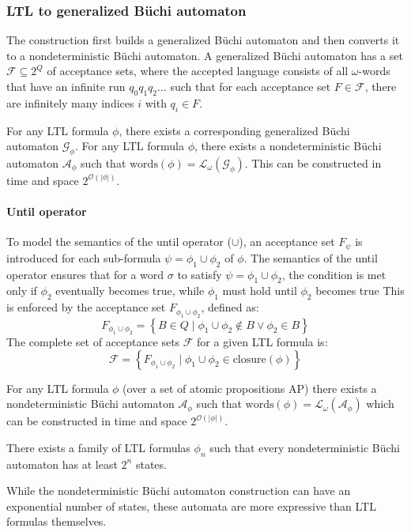 \subsubsection{LTL to generalized Büchi automaton}
The construction first builds a generalized Büchi automaton and then converts it to a nondeterministic Büchi automaton. 
A generalized Büchi automaton has a set $\mathcal{F}\subseteq 2^Q$ of acceptance sets, where the accepted language consists of all $\omega$-words that have an infinite run $q_0q_1q_2\dots$ such that for each acceptance set $F \in \mathcal{F}$, there are infinitely many indices $i$ with $q_i\in F$.

For any LTL formula $\phi$, there exists a corresponding generalized Büchi automaton $\mathcal{G}_{\phi}$. 
For any LTL formula $\phi$, there exists a nondeterministic Büchi automaton $\mathcal{A}_\phi$ such that $\text{words}(\phi)=\mathcal{L}_{\omega}(\mathcal{G}_{\phi})$. 
This can be constructed in time and space $2^{\mathcal{O}(\left\lvert \phi\right\rvert )}$.

\paragraph*{Until operator}
To model the semantics of the until operator ($\cup$), an acceptance set $F_\psi$  is introduced for each sub-formula $\psi = \phi_1 \cup \phi_2$ of $\phi$.
The semantics of the until operator ensures that for a word $\sigma$ to satisfy $\psi = \phi_1 \cup \phi_2$, the condition is met only if $\phi_2$ eventually becomes true, while $\phi_1$ must hold until $\phi_2$ becomes true
This is enforced by the acceptance set $F_{\phi_1\cup\phi_2}$, defined as: 
\[F_{\phi_1\cup\phi_2}=\left\{B \in Q\mid\phi_1\cup\phi_2\notin B \lor \phi_2\in B\right\}\]
\noindent The complete set of acceptance sets $\mathcal{F}$ for a given LTL formula is:
\[\mathcal{F}=\left\{F_{\phi_1\cup\phi_2}\mid\phi_1\cup\phi_2\in\text{closure}(\phi)\right\}\]

\begin{theorem}
    For any LTL formula $\phi$ (over a set of atomic propositions $\text{AP}$) there exists a nondeterministic Büchi automaton $\mathcal{A}_\phi$ such that $\text{words}(\phi)=\mathcal{L}_{\omega}(\mathcal{A}_\phi)$ which can be constructed in time and space $2^{\mathcal{O}(\left\lvert \phi\right\rvert )}$.
\end{theorem}
\begin{theorem}
    There exists a family of LTL formulas $\phi_n$ such that every nondeterministic Büchi automaton has at least $2^n$ states. 
\end{theorem}
\noindent While the nondeterministic Büchi automaton construction can have an exponential number of states, these automata are more expressive than LTL formulas themselves.

